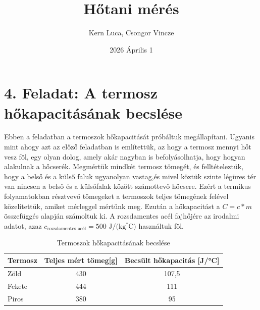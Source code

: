 \documentclass{article}
\title{Hőtani mérés}
\author{Kern Luca, Csongor Vincze}
\date{2026 Április 1}
\begin{document}
\maketitle

\section*{4. Feladat: A termosz hőkapacitásának becslése}


Ebben a feladatban a termoszok hőkapacitását próbáltuk megállapítani. Ugyanis mint ahogy azt az előző feladatban is említettük, az hogy a termosz mennyi hőt vesz föl, egy olyan dolog, amely akár nagyban is befolyásolhatja, hogy hogyan alakulnak a hőcserék. Megmértük mindkét termosz tömegét, és felltételeztük, hogy a belső és a külső faluk ugyanolyan vastag,és mivel köztük szinte légüres tér van nincsen a belső és a külsőfalak között számottevő hőcsere. Ezért a termikus folyamatokban  résztvevő tömegeket a termoszok teljes tömegének felével közelítettük, amiket mérleggel mértünk meg. Ezután a hőkapacitást a $C=c*m$ összefüggés alapján számoltuk ki. A rozsdamentes acél fajhőjére az irodalmi adatot, azaz $c_{\text{rozsdamentes acél}}=500 \text{ J/(kg}^{\circ}\text{C)}$ használtuk föl.

\begin{table}[H]
    \centering
    \begin{tabular}{|l|c|c|}
        \hline
        Termosz & Teljes mért tömeg[g] & Becsült hőkapacitás [J/°C] \\\hline
        Zöld & 430 & 107,5 \\ \hline
        Fekete & 444 & 111 \\ \hline
        Piros & 380 & 95 \\ \hline
    \end{tabular}
    \caption{Termoszok hőkapacitásának becslése}
    \label{tab:hotan_4}
\end{table}

\end{document}
